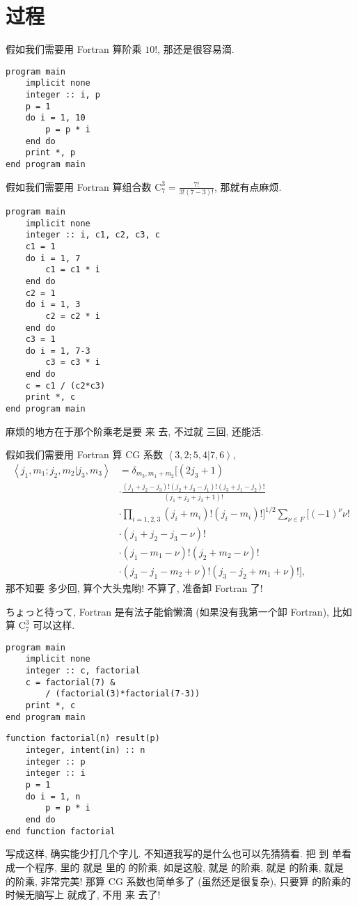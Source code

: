 \chapter{过程} \label{fortran_procedure} 

假如我们需要用 Fortran 算阶乘 $ 10! $, 那还是很容易滴. 
\begin{lstlisting} 
program main
    implicit none
    integer :: i, p
    p = 1
    do i = 1, 10
        p = p * i
    end do
    print *, p
end program main
\end{lstlisting} 

假如我们需要用 Fortran 算组合数 $ \text{C} _7^3=\frac{7!} {3!(7-3)!} $, 那就有点麻烦. 
\begin{lstlisting} 
program main
    implicit none
    integer :: i, c1, c2, c3, c
    c1 = 1
    do i = 1, 7
        c1 = c1 * i
    end do
    c2 = 1
    do i = 1, 3
        c2 = c2 * i
    end do
    c3 = 1
    do i = 1, 7-3
        c3 = c3 * i
    end do
    c = c1 / (c2*c3)
    print *, c
end program main
\end{lstlisting} 
麻烦的地方在于那个阶乘老是要  来  去, 不过就  三回, 还能活. 

假如我们需要用 Fortran 算 CG 系数 $ \left\langle 3, 2;5, 4|7, 6\right\rangle  $, 
\begin{align*} 
    \left\langle j_1, m_1;j_2, m_2|j_3, m_3\right\rangle&=\delta_{m_3, m_1+m_2} \Big[(2j_3+1)\\
    &\cdot\frac{(j_1+j_2-j_3)!(j_2+j_3-j_1)!(j_3+j_1-j_2)!} {(j_1+j_2+j_3+1)!} 
    \\
    &\cdot\prod_{i=1, 2, 3}(j_i+m_i)!(j_i-m_i)!\Big]^{1/2} \sum_{\nu\in F} [(-1)^{\nu} \nu!\\
    &\cdot(j_1+j_2-j_3-\nu)!\\
    &\cdot(j_1-m_1-\nu)!(j_2+m_2-\nu)!\\
    &\cdot(j_3-j_1-m_2+\nu)!(j_3-j_2+m_1+\nu)!], 
\end{align*} 
那不知要  多少回, 算个大头鬼哟! 不算了, 准备卸 Fortran 了!

ちょっと待って, Fortran 是有法子能偷懒滴 (如果没有我第一个卸 Fortran), 比如算 $ \text{C} _7^3 $ 可以这样. 
\begin{lstlisting} 
program main
    implicit none
    integer :: c, factorial
    c = factorial(7) &
        / (factorial(3)*factorial(7-3))
    print *, c
end program main
\end{lstlisting}
\begin{lstlisting}
function factorial(n) result(p)
    integer, intent(in) :: n
    integer :: p
    integer :: i 
    p = 1
    do i = 1, n
        p = p * i
    end do
end function factorial
\end{lstlisting} 
写成这样, 确实能少打几个字儿. 不知道我写的是什么也可以先猜猜看. 把  到  单看成一个程序,  里的  就是  里的  的阶乘, 如是这般,  就是  的阶乘,  就是  的阶乘,  就是  的阶乘, 非常完美! 那算 CG 系数也简单多了 (虽然还是很复杂), 只要算  的阶乘的时候无脑写上  就成了, 不用  来  去了!

